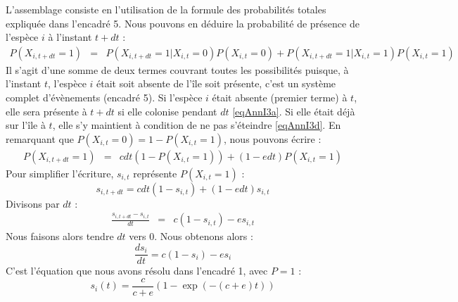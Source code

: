 L'assemblage consiste en l'utilisation de la formule des probabilités totales expliquée dans l'encadré 5. Nous pouvons en déduire la probabilité de présence de l'espèce $i$ à l'instant $t+dt$ :
\begin{eqnarray}
\label{eqAnnI4} P(X_{i,t+dt}=1)&=&P(X_{i,t+dt}=1|X_{i,t}=0)P(X_{i,t}=0)+P(X_{i,t+dt}=1|X_{i,t}=1)P(X_{i,t}=1)
\end{eqnarray}
Il s'agit d'une somme de deux termes couvrant toutes les possibilités puisque, à l'instant $t$, l'espèce $i$ était soit absente de l'île soit présente, c'est un système complet d'évènements (encadré 5). Si l'espèce $i$ était absente (premier terme) à $t$, elle sera présente à $t+dt$ si elle colonise pendant $dt$ \eqref{eqAnnI3a}. Si elle était déjà sur l'île à $t$, elle s'y maintient à condition de ne pas s'éteindre \eqref{eqAnnI3d}. En remarquant que $P(X_{i,t}=0)=1-P(X_{i,t}=1)$, nous pouvons écrire :
\begin{eqnarray}
\label{eqAnnI5a} P(X_{i,t+dt}=1)&=&cdt(1-P(X_{i,t}=1))+(1-edt)P(X_{i,t}=1)
\end{eqnarray}
Pour simplifier l'écriture, $s_{i,t}$ représente $P(X_{i,t}=1)$ :
\begin{equation}
\label{eqAnnI5b} s_{i,t+dt}=cdt(1-s_{i,t})+(1-edt)s_{i,t}
\end{equation}
Divisons par $dt$ :
\begin{eqnarray}
\label{eqAnnI5c} \frac{s_{i,t+dt}-s_{i,t}}{dt}&=&c(1-s_{i,t})-es_{i,t}
\end{eqnarray}
Nous faisons alors tendre $dt$ vers 0. Nous obtenons alors :
\begin{equation}
\label{eqAnnI5e} \frac{ds_{i}}{dt}=c(1-s_{i})-es_{i}
\end{equation}
C'est l'équation que nous avons résolu dans l'encadré 1, avec $P=1$  :
\begin{equation}
\label{eqAnnI5e} s_{i}(t)=\frac{c}{c+e} \left(1-\exp{(-(c+e)t)}\right)
\end{equation}

